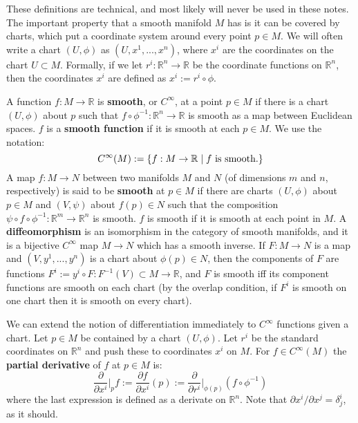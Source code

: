 \documentclass[11pt, oneside]{article}   	%
\theoremstyle{definition}
\begin{document}
These definitions are technical, and most likely will never be used in these notes. The important property that a smooth manifold 
$M$ has is it can be covered by charts, which put a coordinate system around every point $p\in M$. We will often write a chart 
$(U, \phi)$ as $(U, x^1, ..., x^n)$, where $x^i$ are the coordinates on the chart $U\subset M$. Formally, if we let $r^i : \mathbb 
R^n\rightarrow\mathbb R$ be the coordinate functions on $\mathbb R^n$, then the coordinates $x^i$ are defined as 
$x^i := r^i\circ\phi$. 

A function $f : M\rightarrow\mathbb R$ is \textbf{smooth}, or $C^\infty$, at a point $p\in M$ if there is a chart $(U, \phi)$ about 
$p$ such that $f\circ \phi^{-1} : \mathbb R^n\rightarrow\mathbb R$ is smooth as a map between Euclidean spaces. $f$ is a 
\textbf{smooth function} if it is smooth at each $p\in M$. We use the notation:
\begin{equation}
	C^\infty(M) := \{ f : M\rightarrow\mathbb R \; | \; f \textnormal{ is smooth.}\}
\end{equation}
A map $f : M\rightarrow N$ between two manifolds $M$ and $N$ (of dimensions $m$ and $n$, respectively) is said to be 
\textbf{smooth} at $p\in M$ if there are charts $(U, \phi)$ about $p\in M$ and $(V, \psi)$ about $f(p)\in N$ such that the 
composition $\psi\circ f\circ\phi^{-1} : \mathbb R^m\rightarrow\mathbb R^n$ is smooth. $f$ is smooth if it is smooth at each point 
in $M$. A \textbf{diffeomorphism} is an isomorphism in the category of smooth manifolds, and it is a bijective $C^\infty$ map $M
\rightarrow N$ which has a smooth inverse. If $F : M\rightarrow N$ is a map and $(V, y^1, ..., y^n)$ is a chart about $\phi(p)\in 
N$, then the components of $F$ are functions $F^i := y^i\circ F : F^{-1}(V)\subset M\rightarrow\mathbb R$, and $F$ is 
smooth iff its component functions are smooth on each chart (by the overlap condition, if $F^i$ is smooth on one chart then it 
is smooth on every chart). 

We can extend the notion of differentiation immediately to $C^\infty$ functions given a chart. Let $p\in M$ be contained by 
a chart $(U, \phi)$. Let $r^i$ be the standard coordinates on $\mathbb R^n$ and push these to coordinates $x^i$ on $M$. For
$f\in C^\infty(M)$ the \textbf{partial derivative} of $f$ at $p\in M$ is:
\begin{equation}
	\frac{\partial}{\partial x^i}\bigg|_p f := \frac{\partial f}{\partial x^i}(p) := \frac{\partial}{\partial r^i}\bigg|_{\phi(p)} (f\circ\phi^{-1})
\end{equation}
where the last expression is defined as a derivate on $\mathbb R^n$. Note that $\partial x^i / \partial x^j = \delta^i_j$, as it 
should. 
\end{document}
